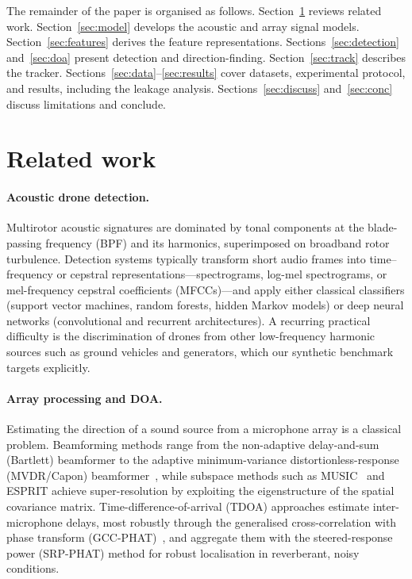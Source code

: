 \documentclass[11pt]{article}
\begin{document}
The remainder of the paper is organised as follows. Section~\ref{sec:related}
reviews related work. Section~\ref{sec:model} develops the acoustic and array
signal models. Section~\ref{sec:features} derives the feature representations.
Sections~\ref{sec:detection} and~\ref{sec:doa} present detection and
direction-finding. Section~\ref{sec:track} describes the tracker.
Sections~\ref{sec:data}--\ref{sec:results} cover datasets, experimental protocol,
and results, including the leakage analysis. Sections~\ref{sec:discuss}
and~\ref{sec:conc} discuss limitations and conclude.

\section{Related work}
\label{sec:related}
\paragraph{Acoustic drone detection.} Multirotor acoustic signatures are
dominated by tonal components at the blade-passing frequency (BPF) and its
harmonics, superimposed on broadband rotor turbulence. Detection systems
typically transform short audio frames into time--frequency or cepstral
representations---spectrograms, log-mel spectrograms, or mel-frequency cepstral
coefficients (MFCCs)---and apply either classical classifiers (support vector
machines, random forests, hidden Markov models) or deep neural networks
(convolutional and recurrent architectures). A recurring practical difficulty is
the discrimination of drones from other low-frequency harmonic sources such as
ground vehicles and generators, which our synthetic benchmark targets explicitly.

\paragraph{Array processing and DOA.} Estimating the direction of a sound source
from a microphone array is a classical problem. Beamforming methods range from
the non-adaptive delay-and-sum (Bartlett) beamformer to the adaptive minimum-variance
distortionless-response (MVDR/Capon) beamformer~\cite{capon}, while
subspace methods such as MUSIC~\cite{schmidt} and ESPRIT achieve
super-resolution by exploiting the eigenstructure of the spatial covariance
matrix. Time-difference-of-arrival (TDOA) approaches estimate inter-microphone
delays, most robustly through the generalised cross-correlation with phase
transform (GCC-PHAT)~\cite{knapp}, and aggregate them with the steered-response
power (SRP-PHAT) method for robust localisation in reverberant, noisy conditions.
\end{document}
